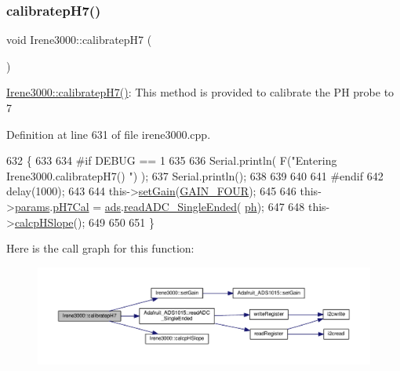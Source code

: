 \subsubsection{\texorpdfstring{calibratep\+H7()}{calibratepH7()}}
{\footnotesize\ttfamily void Irene3000\+::calibratep\+H7 (\begin{DoxyParamCaption}{ }\end{DoxyParamCaption})}

\hyperlink{class_irene3000_a1d3299202e4cb7afcff9c9e3e95d94c1}{Irene3000\+::calibratep\+H7()}\+: This method is provided to calibrate the PH probe to 7 

Definition at line 631 of file irene3000.\+cpp.


\begin{DoxyCode}
632 \{
633 
634 \textcolor{preprocessor}{#if DEBUG == 1 }
635 
636     Serial.println( F(\textcolor{stringliteral}{"Entering Irene3000.calibratepH7() "}) );
637     Serial.println();
638     
639     
640 
641 \textcolor{preprocessor}{#endif }
642     delay(1000);
643 
644     this->\hyperlink{class_irene3000_aff7c5da186b388e7272e63ff88a20c34}{setGain}(\hyperlink{_cool_adafruit___a_d_s1015_8h_a3d6c0e15829a207b9155890811fa4781a33fa5521f4e806b7438052fcdbbf8660}{GAIN\_FOUR});
645         
646     this->\hyperlink{class_irene3000_a136585a5ee7f9ac6ab52175fa153f8e3}{params}.\hyperlink{struct_irene3000_1_1parameters___t_a21265466a570d84bff914f26d2f7a03e}{pH7Cal} = \hyperlink{class_irene3000_a1215e77ba761c9908d80d691f149e135}{ads}.\hyperlink{class_adafruit___a_d_s1015_a40f38b9e1f3ec397c0670dd632510235}{readADC\_SingleEnded}(
      \hyperlink{_irene3000_8h_af771ceafe0e6524dd8497d4305dfe778}{ph});
647  
648     this->\hyperlink{class_irene3000_a81f6a79e546679692053f7ac1af49613}{calcpHSlope}();
649 
650 
651 \}
\end{DoxyCode}
Here is the call graph for this function\+:\nopagebreak
\begin{figure}[H]
\begin{center}
\leavevmode
\includegraphics[width=350pt]{d6/d03/class_irene3000_a1d3299202e4cb7afcff9c9e3e95d94c1_cgraph}
\end{center}
\end{figure}
